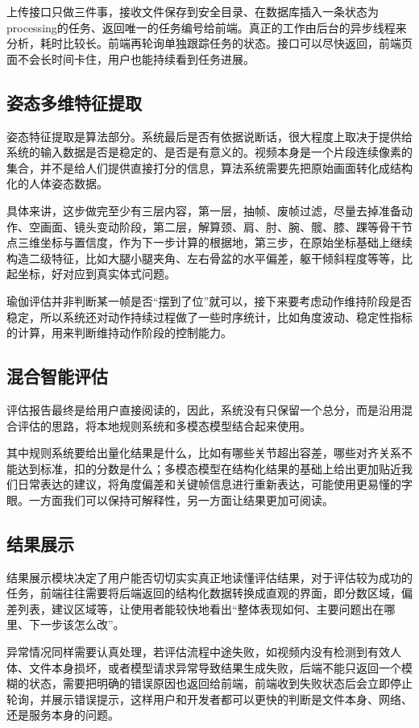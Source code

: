 \documentclass[UTF8,twoside]{ctexrep}
\makeatletter
\def@NAT@last@yr{\@citea}%
\def@NAT@last@yr{-\NAT@penalty}%
\makeatother
\begin{document}
上传接口只做三件事，接收文件保存到安全目录、在数据库插入一条状态为processing的任务、返回唯一的任务编号给前端。真正的工作由后台的异步线程来分析，耗时比较长。前端再轮询单独跟踪任务的状态。接口可以尽快返回，前端页面不会长时间卡住，用户也能持续看到任务进展。

\subsection{姿态多维特征提取}
姿态特征提取是算法部分。系统最后是否有依据说断话，很大程度上取决于提供给系统的输入数据是否是稳定的、是否是有意义的。视频本身是一个片段连续像素的集合，并不是给人们提供直接打分的信息，算法系统需要先把原始画面转化成结构化的人体姿态数据。

具体来讲，这步做完至少有三层内容，第一层，抽帧、废帧过滤，尽量去掉准备动作、空画面、镜头变动阶段，第二层，解算颈、肩、肘、腕、髋、膝、踝等骨干节点三维坐标与置信度，作为下一步计算的根据地，第三步，在原始坐标基础上继续构造二级特征，比如大腿小腿夹角、左右骨盆的水平偏差，躯干倾斜程度等等，比起坐标，好对应到真实体式问题。

瑜伽评估并非判断某一帧是否“摆到了位”就可以，接下来要考虑动作维持阶段是否稳定，所以系统还对动作持续过程做了一些时序统计，比如角度波动、稳定性指标的计算，用来判断维持动作阶段的控制能力。

\subsection{混合智能评估}
评估报告最终是给用户直接阅读的，因此，系统没有只保留一个总分，而是沿用混合评估的思路，将本地规则系统和多模态模型结合起来使用。

其中规则系统要给出量化结果是什么，比如有哪些关节超出容差，哪些对齐关系不能达到标准，扣的分数是什么；多模态模型在结构化结果的基础上给出更加贴近我们日常表达的建议，将角度偏差和关键帧信息进行重新表达，可能使用更易懂的字眼。一方面我们可以保持可解释性，另一方面让结果更加可阅读。

\subsection{结果展示}
结果展示模块决定了用户能否切切实实真正地读懂评估结果，对于评估较为成功的任务，前端往往需要将后端返回的结构化数据转换成直观的界面，即分数区域，偏差列表，建议区域等，让使用者能较快地看出“整体表现如何、主要问题出在哪里、下一步该怎么改”。

异常情况同样需要认真处理，若评估流程中途失败，如视频内没有检测到有效人体、文件本身损坏，或者模型请求异常导致结果生成失败，后端不能只返回一个模糊的状态，需要把明确的错误原因也返回给前端，前端收到失败状态后会立即停止轮询，并展示错误提示，这样用户和开发者都可以更快的判断是文件本身、网络、还是服务本身的问题。
\end{document}

